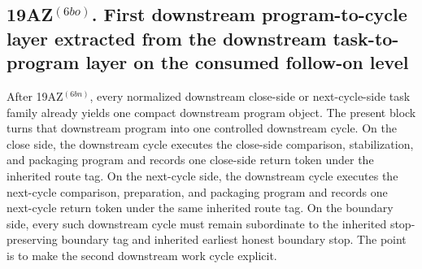 \subsection*{19AZ$^{(6bo)}$. First downstream program-to-cycle layer extracted from the downstream task-to-program layer on the consumed follow-on level}
\label{sec:first-downstream-program-to-cycle-layer-extracted-from-the-downstream-task-to-program-layer-on-the-consumed-follow-on-level}
After 19AZ$^{(6bn)}$, every normalized downstream close-side or next-cycle-side task family already yields one compact downstream program object. The present block turns that downstream program into one controlled downstream cycle. On the close side, the downstream cycle executes the close-side comparison, stabilization, and packaging program and records one close-side return token under the inherited route tag. On the next-cycle side, the downstream cycle executes the next-cycle comparison, preparation, and packaging program and records one next-cycle return token under the same inherited route tag. On the boundary side, every such downstream cycle must remain subordinate to the inherited stop-preserving boundary tag and inherited earliest honest boundary stop. The point is to make the second downstream work cycle explicit.

